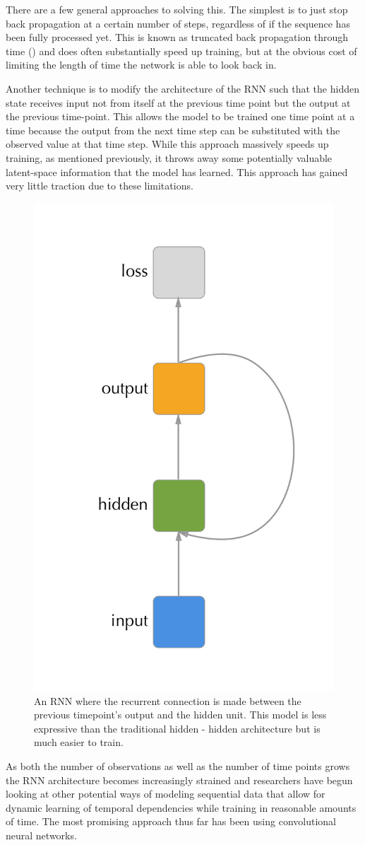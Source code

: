 \documentclass[]{book}
\theoremstyle{definition}
\theoremstyle{definition}
\theoremstyle{definition}
\theoremstyle{remark}
\begin{document}
There are a few general approaches to solving this. The simplest is to
just stop back propagation at a certain number of steps, regardless of
if the sequence has been fully processed yet. This is known as truncated
back propagation through time (\citet{trunc_bptt}) and does often
substantially speed up training, but at the obvious cost of limiting the
length of time the network is able to look back in.

Another technique is to modify the architecture of the RNN such that the
hidden state receives input not from itself at the previous time point
but the output at the previous time-point. This allows the model to be
trained one time point at a time because the output from the next time
step can be substituted with the observed value at that time step. While
this approach massively speeds up training, as mentioned previously, it
throws away some potentially valuable latent-space information that the
model has learned. This approach has gained very little traction due to
these limitations.

\begin{figure}

{\centering \includegraphics[width=0.45\linewidth]{figures/output_rnn} 

}

\caption{An RNN where the recurrent connection is made between the previous timepoint's output and the hidden unit. This model is less expressive than the traditional hidden - hidden architecture but is much easier to train.}\label{fig:outputrnn}
\end{figure}

As both the number of observations as well as the number of time points
grows the RNN architecture becomes increasingly strained and researchers
have begun looking at other potential ways of modeling sequential data
that allow for dynamic learning of temporal dependencies while training
in reasonable amounts of time. The most promising approach thus far has
been using convolutional neural networks.
\end{document}
